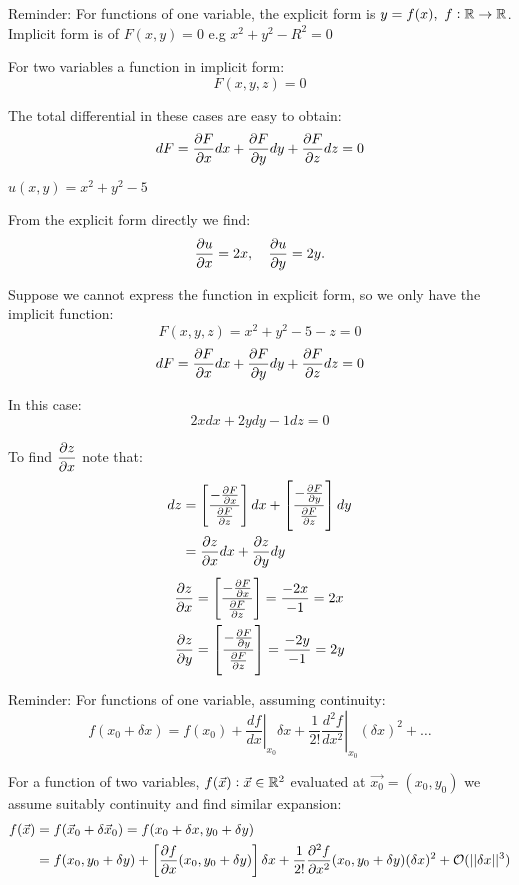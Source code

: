 \documentclass[twoside]{scrartcl}
\begin{document}
Reminder: For functions of one variable, the explicit form is $y = f(x),~ f: \mathbb{R} \to \mathbb{R}$. Implicit form is of $F(x,y) = 0$ e.g $x^2 + y^2 -R^2 = 0$\\

\begin{definition}For two variables a function in implicit form: 
\[F(x,y,z) = 0\]
\end{definition}

The total differential in these cases are easy to obtain:
\[dF = \frac{\partial F}{\partial x}dx + \frac{\partial F}{\partial y}dy + \frac{\partial F}{\partial z}dz = 0\]
\begin{example}
$u(x,y) = x^2 + y^2 - 5$

From the explicit form directly we find:
\[\frac{\partial u}{\partial x} = 2x, \quad \frac{\partial u}{\partial y} = 2y.\]	

Suppose we cannot express the function in explicit form, so we only have the implicit function:
\[F(x,y,z) = x^2 + y^2 -5 - z = 0\]
\[dF = \frac{\partial F}{\partial x}dx + \frac{\partial F}{\partial y}dy + \frac{\partial F}{\partial z}dz = 0\]

In this case: 
\[2xdx + 2ydy -1dz = 0\]

To find $\dfrac{\partial z}{\partial x}$ note that:
\[
\begin{aligned}
  dz &= \left[\frac{-\frac{\partial F}{\partial x}}{\frac{\partial F}{\partial z}}\right]dx
  + 
  \left[\frac{-\frac{\partial F}{\partial y}}{\frac{\partial F}{\partial z}}\right]dy\\
  &= \frac{\partial z}{\partial x}dx + \frac{\partial z}{\partial y}dy
\end{aligned}
\]
\[
\begin{aligned}
  \frac{\partial z}{\partial x} &= \left[\frac{-\frac{\partial F}{\partial x}}{\frac{\partial F}{\partial z}}\right] = \frac{-2x}{-1} = 2x\\
  \frac{\partial z}{\partial y} &=  \left[\frac{-\frac{\partial F}{\partial y}}{\frac{\partial F}{\partial z}}\right] = \frac{-2y}{-1} = 2y
\end{aligned}
\]
\end{example}



Reminder: 
 For functions of one variable, assuming continuity: 
\[f(x_0 + \delta x) = f(x_0) + \left.\frac{df}{dx}\right|_{x_0}\delta x + \frac{1}{2!}\left.\frac{d^2f}{dx^2}\right|_{x_0}(\delta x)^2 + \dots\]

For a function of two variables, $f(\vec{x}): \vec{x} \in\mathbb{R}^2$ evaluated at $\vec{x_0} = (x_0,y_0)$ we assume suitably continuity and find similar expansion: 
\[
\begin{aligned}
  f(\vec{x}) &= f(\vec{x}_0 + \delta\vec{x}_0) = f(x_0+\delta x, y_0 + \delta y) \\
  &= f(x_0, y_0 + \delta y) + \left[\frac{\partial f}{\partial x}(x_0,y_0 + \delta y)\right]\delta x + \frac{1}{2!}\frac{\partial^2f}{\partial x^2}(x_0,y_0+\delta y)(\delta x)^2 + \mathcal{O}(||\delta x||^3)\\
\end{aligned}
\]
\end{document}

